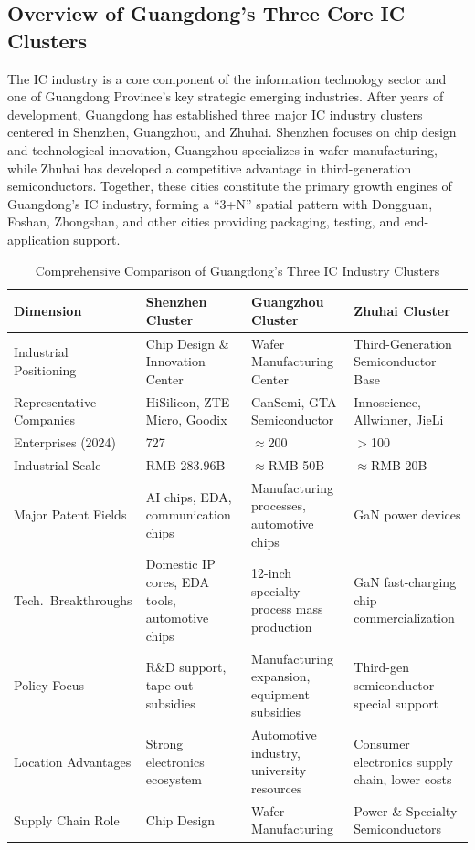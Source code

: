 \documentclass[12pt,a4paper]{article}
\newcommand{\tableHeaderRow}{\rowcolor{tealPrimary}\color{white}}
\newcommand{\tableOddRow}{\rowcolor{mintBG}}
\newcommand{\tableEvenRow}{\rowcolor{white}}
\begin{document}
\subsection{Overview of Guangdong's Three Core IC Clusters}
\label{sec:cluster_overview}

The IC industry is a core component of the information technology sector
and one of Guangdong Province's key strategic emerging industries. After
years of development, Guangdong has established three major IC industry
clusters centered in Shenzhen, Guangzhou, and Zhuhai. Shenzhen focuses on
chip design and technological innovation, Guangzhou specializes in wafer
manufacturing, while Zhuhai has developed a competitive advantage in
third-generation semiconductors. Together, these cities constitute the
primary growth engines of Guangdong's IC industry, forming a ``3+N''
spatial pattern with Dongguan, Foshan, Zhongshan, and other cities
providing packaging, testing, and end-application support.

\begin{table}[H]
\centering
\small
\caption{Comprehensive Comparison of Guangdong's Three IC Industry Clusters}
\label{tab:three_clusters}
\begin{tabular}{p{2.5cm}p{3.5cm}p{3.5cm}p{3.5cm}}
\toprule
\tableHeaderRow
\textbf{Dimension} & \textbf{Shenzhen Cluster} & \textbf{Guangzhou Cluster} & \textbf{Zhuhai Cluster} \\
\midrule
\tableOddRow Industrial Positioning & Chip Design \& Innovation Center & Wafer Manufacturing Center & Third-Generation Semiconductor Base \\
\tableEvenRow Representative Companies & HiSilicon, ZTE Micro, Goodix & CanSemi, GTA Semiconductor & Innoscience, Allwinner, JieLi \\
\tableOddRow Enterprises (2024) & 727 & $\approx$200 & $>$100 \\
\tableEvenRow Industrial Scale & RMB 283.96B & $\approx$RMB 50B & $\approx$RMB 20B \\
\tableOddRow Major Patent Fields & AI chips, EDA, communication chips & Manufacturing processes, automotive chips & GaN power devices \\
\tableEvenRow Tech.\ Breakthroughs & Domestic IP cores, EDA tools, automotive chips & 12-inch specialty process mass production & GaN fast-charging chip commercialization \\
\tableOddRow Policy Focus & R\&D support, tape-out subsidies & Manufacturing expansion, equipment subsidies & Third-gen semiconductor special support \\
\tableEvenRow Location Advantages & Strong electronics ecosystem & Automotive industry, university resources & Consumer electronics supply chain, lower costs \\
\tableOddRow Supply Chain Role & Chip Design & Wafer Manufacturing & Power \& Specialty Semiconductors \\
\bottomrule
\end{tabular}
\end{table}
\end{document}
